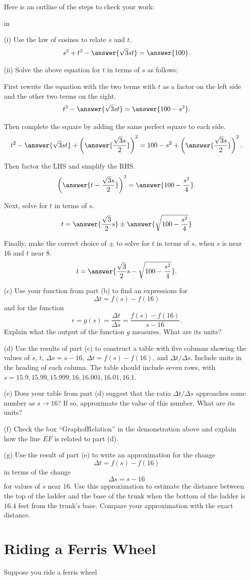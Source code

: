 \documentclass{ximera}
\newcommand{\pskip}{\vskip 0.1 in}
\begin{document}
\begin{example}
\begin{hint}
Here is an outline of the steps to check your work:

\pskip 

(i) Use the law of cosines to relate $s$ and $t$.
\[
  s^2 + t^2 - \answer{\sqrt{3}st} = \answer{100} .
\]

(ii) Solve the above equation for $t$ in terms of $s$ as follows:

First rewrite the equation with the two terms with $t$ as a factor on the left side and the other two terms on the right.
\[
     t^2 - \answer{\sqrt{3}st} = \answer{100-s^2} .
\]

Then complete the square by adding the same perfect square to each side.
\[
     t^2 - \answer{\sqrt{3}st} + \left( \answer{\frac{\sqrt{3}s}{2}} \right)^2 = 100-s^2 +  \left( \answer{\frac{\sqrt{3}s}{2}} \right)^2 .
\]

Then factor the LHS and simplify the RHS.
\[
        \left( \answer{t - \frac{\sqrt{3}s}{2}} \right)^2 = \answer{100-\frac{s^2}{4}} .
\]

Next, solve for $t$ in terms of $s$.
\[
    t = \answer{\frac{\sqrt{3}}{2}s}  \pm \answer{\sqrt{100-\frac{s^2}{4}}}
\]

Finally, make the correct choice of $\pm$ to solve for $t$ in terms of $s$, when $s$ is near $16$ and $t$ near $8$.
\[
    t = \answer{\frac{\sqrt{3}}{2}s - \sqrt{100-\frac{s^2}{4}}}  .
\]

\end{hint}



(c) Use your function from part (b) to find an expressions for
\[
  \Delta t = f(s) - f(16)
\]
and for the function
\[
  r = g(s) = \frac{\Delta t}{\Delta s} = \frac{f(s) - f(16)}{s-16} .
\]
Explain what the output of the function $g$ measures. What are its units?


(d) Use the results of part (c) to construct a table with five columns showing the values of $s$, $t$, $\Delta s = s-16$, $\Delta t =f(s)-f(16)$, and $\Delta t / \Delta s$. Include units in the heading of each column. The table should include seven rows, with $s=15.9,15.99, 15.999, 16, 16.001, 16.01, 16.1$.

(e) Does  your table from part (d) suggest that the ratio $\Delta t/ \Delta s$ approaches some number as $s \to 16$? If so, approximate the value of this number. What are its units?

(f) Check the box ``GraphofRelation'' in the demonstration above and explain how the line $EF$ is related to part (d).

(g) Use the result of part (e) to write an approximation for the change
\[
   \Delta t = f(s)- f(16)
\]
in terms of the change
\[
  \Delta s = s - 16  
\]  
for values of $s$ near $16$. Use this approximation to estimate the distance between the top of the ladder and the base of the trunk when the bottom of the ladder is $16.4$ feet from the trunk's base. Compare your approximation with the exact distance.

\end{example}





\section{Riding a Ferris Wheel}


Suppose  you ride a ferris wheel
\end{document}
